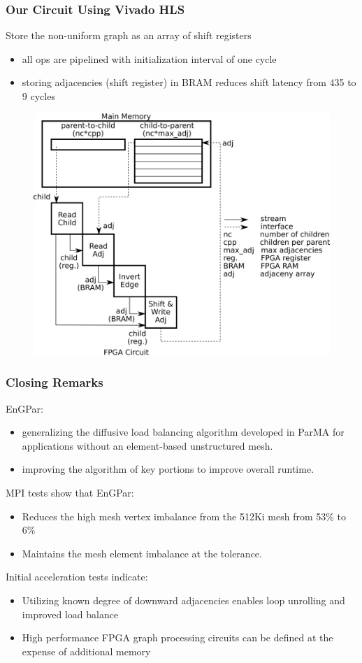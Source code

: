 \documentclass{beamer}
\begin{document}
\begin{frame}
  \frametitle{Our Circuit Using Vivado HLS}
  Store the non-uniform graph as an array of shift registers
  \begin{itemize}
    \item all ops are pipelined with initialization interval of one cycle
    \item storing adjacencies (shift register) in BRAM reduces shift latency from 435 to 9 cycles
  \end{itemize}
  \begin{figure}
    \centering
    \includegraphics[width=.60\textwidth]{figures/invert.png}
  \end{figure}
\end{frame}

\begin{frame}
  \frametitle{Closing Remarks}
  EnGPar:
  \begin {itemize}
  \item generalizing the diffusive load balancing algorithm developed in ParMA for applications without an element-based unstructured mesh.
  \item improving the algorithm of key portions to improve overall runtime.
  \end{itemize}
  MPI tests show that EnGPar:
  \begin {itemize}
  \item Reduces the high mesh vertex imbalance from the 512Ki mesh from 53\% to 6\%
  \item Maintains the mesh element imbalance at the tolerance.
  \end{itemize}
  Initial acceleration tests indicate:
  \begin {itemize}
  \item Utilizing known degree of downward adjacencies enables
    loop unrolling and improved load balance
  \item High performance FPGA graph processing circuits can be defined at the expense of additional memory
  \end{itemize}
\end{frame}
\end{document}
